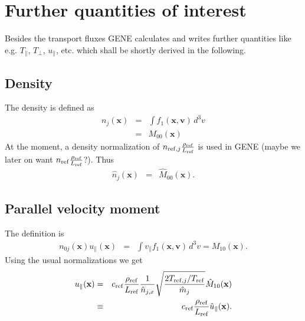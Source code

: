 \section{Further quantities of interest}
\label{sec:moremom}
Besides the transport fluxes {\sc GENE} calculates and writes 
further quantities like e.g. $T_\|$, $T_\perp$, $u_\|$, etc.
which shall be shortly derived in the following.

\subsection{Density}
The density is defined as
\begin{eqnarray*}
n_j(\mathbf{x}) & = & \int f_1(\mathbf{x},\mathbf{v})\,d^3v\\
&=& M_{00}(\mathbf{x})
\end{eqnarray*}
At the moment, a density normalization of $n_{\mathrm{ref},j} \frac{\rho_{\mathrm{ref}}}{L_{\mathrm{ref}}}$
is used in {\sc GENE} (maybe we later on want $n_{\mathrm{ref}} \frac{\rho_{\mathrm{ref}}}{L_{\mathrm{ref}}}$?).
Thus
\begin{eqnarray*}
\hat{n}_j(\mathbf{x}) & = & \hat{M}_{00}(\mathbf{x}).
\end{eqnarray*}

\subsection{Parallel velocity moment}
The definition is
\begin{eqnarray*}
n_{0j}(\mathbf{x}) u_\| (\mathbf{x}) &=& \int v_\| f_1(\mathbf{x},\mathbf{v})\,d^3v 
 =M_{10}(\mathbf{x}).
\end{eqnarray*}
Using the usual normalizations we get
\begin{eqnarray*}
u_\| (\mathbf{x}) &=& c_{\mathrm{ref}}\frac{\rho_{\mathrm{ref}}}{L_{\mathrm{ref}}} \frac{1}{\hat{n}_{j,x}} 
  \sqrt{\frac{2T_{\mathrm{ref},j}/T_{\mathrm{ref}}}{\hat{m}_j}}\hat{M}_{10}(\mathbf{x}) \\
& \equiv & c_{\mathrm{ref}}\frac{\rho_{\mathrm{ref}}}{L_{\mathrm{ref}}} \hat{u}_\| (\mathbf{x}).
\end{eqnarray*}

